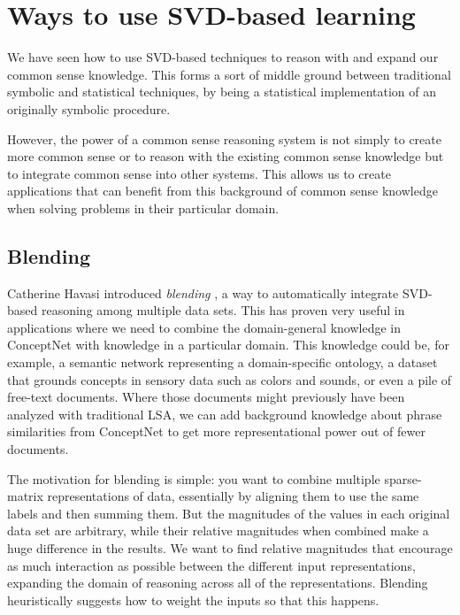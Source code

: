 \documentclass[11pt]{article}
\begin{document}
%

\section{Ways to use SVD-based learning}

We have seen how to use SVD-based techniques to reason with and expand our common sense knowledge. This forms a sort of middle ground between traditional symbolic and statistical techniques, by being a statistical implementation of an originally symbolic procedure.

However, the power of a common sense reasoning system is not simply to create more common sense or to reason with the existing common sense knowledge but to integrate common sense into other systems. This allows us to create applications that can benefit from this background of common sense knowledge when solving problems in their particular domain. 

\subsection{Blending}

Catherine Havasi introduced {\em blending} \cite{havasi-thesis}, a way to automatically integrate SVD-based reasoning among multiple data sets. This has proven very useful in applications where we need to combine the domain-general knowledge in ConceptNet with knowledge in a particular domain. This knowledge could be, for example, a semantic network representing a domain-specific ontology, a dataset that grounds concepts in sensory data such as colors and sounds, or even a pile of free-text documents. Where those documents might previously have been analyzed with traditional LSA, we can add background knowledge about phrase similarities from ConceptNet to get more representational power out of fewer documents.

The motivation for blending is simple: you want to combine multiple sparse-matrix representations of data, essentially by aligning them to use the same labels and then summing them. But the magnitudes of the values in each original data set are arbitrary, while their relative magnitudes when combined make a huge difference in the results. We want to find relative magnitudes that encourage as much interaction as possible between the different input representations, expanding the domain of reasoning across all of the representations. Blending heuristically suggests how to weight the inputs so that this happens.
\end{document}

